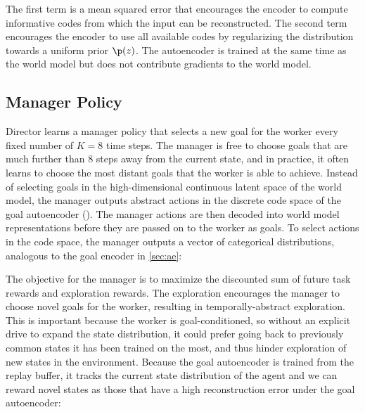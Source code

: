 
The first term is a mean squared error that encourages the encoder to compute informative codes from which the input can be reconstructed.
The second term encourages the encoder to use all available codes by regularizing the distribution towards a uniform prior $\p(z)$.
The autoencoder is trained at the same time as the world model but does not contribute gradients to the world model.

\subsection{Manager Policy}
\label{sec:manager}

Director learns a manager policy that selects a new goal for the worker every fixed number of $K=8$ time steps.
The manager is free to choose goals that are much further than 8 steps away from the current state, and in practice, it often learns to choose the most distant goals that the worker is able to achieve. 
Instead of selecting goals in the high-dimensional continuous latent space of the world model, the manager outputs abstract actions in the discrete code space of the goal autoencoder (). 
The manager actions are then decoded into world model representations before they are passed on to the worker as goals. 
To select actions in the code space, the manager outputs a vector of categorical distributions, analogous to the goal encoder in \cref{sec:ae}:


The objective for the manager is to maximize the discounted sum of future task rewards and exploration rewards.
The exploration encourages the manager to choose novel goals for the worker, resulting in temporally-abstract exploration.
This is important because the worker is goal-conditioned, so without an explicit drive to expand the state distribution, it could prefer going back to previously common states it has been trained on the most, and thus hinder exploration of new states in the environment.
Because the goal autoencoder is trained from the replay buffer, it tracks the current state distribution of the agent and we can reward novel states as those that have a high reconstruction error under the goal autoencoder:


